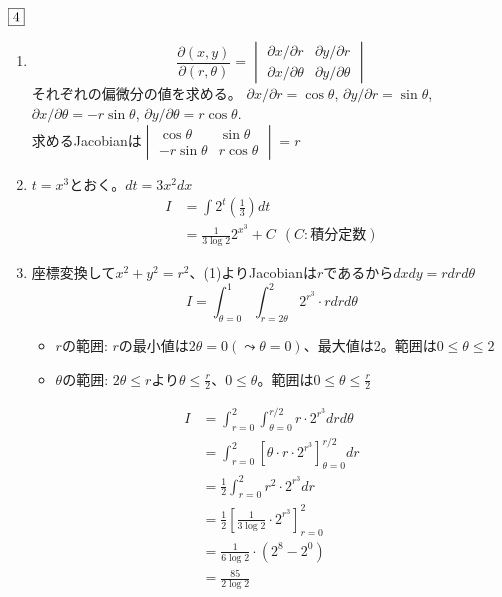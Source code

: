 \documentclass[dvipdfmx]{jsreport}
\newcounter{num}[section]
\begin{document}
\begin{answer} %
	$\fbox{4}$
\begin{enumerate}
	\item 
\begin{equation*}
	\frac{\partial (x, y)}{\partial (r, \theta)}= \begin{vmatrix}{\partial x}/{\partial r}& {\partial y}/{\partial r}\\ {\partial x}/{\partial \theta}& {\partial y}/{\partial \theta}\end{vmatrix}
\end{equation*}
	それぞれの偏微分の値を求める。
	${\partial x}/{\partial r}= \cos{\theta}$, 
	${\partial y}/{\partial r}= \sin{\theta}$, 
	${\partial x}/{\partial \theta}= -r\sin{\theta}$, 
	${\partial y}/{\partial \theta}= r\cos{\theta}$.\\
	求めるJacobianは$\begin{vmatrix}\cos{\theta}& \sin{\theta}\\ -r\sin{\theta}& r\cos{\theta}\end{vmatrix}= r$

	\item $t= x^3$とおく。$dt= 3x^2 dx$
\begin{align*}
	I
	&= \int 2^t \left(\frac{1}{3}\right) dt\\
	&= \frac{1}{3\log{2}} 2^{x^3}+ C\ \ (C:積分定数)
\end{align*}

	\item 座標変換して$x^2+ y^2= r^2$、(1)よりJacobianは$r$であるから$dxdy= r drd\theta$
\begin{equation*}
	I= \int_{\theta= 0}^1 \int_{r= 2\theta}^2 2^{r^3}\cdot rdrd\theta
\end{equation*}

\begin{tcolorbox}
\begin{itemize}
	\item $r$の範囲: $r$の最小値は$2\theta= 0(\leadsto \theta= 0)$、最大値は2。範囲は$0\le \theta\le 2$
	\item $\theta$の範囲: $2\theta\le r$より$\theta\le \frac{r}{2}$、$0\le \theta$。範囲は$0\le \theta\le \frac{r}{2}$
\end{itemize}
\end{tcolorbox}
\begin{align*}
	I
	&= \int_{r= 0}^2\int_{\theta= 0}^{r/2} r\cdot 2^{r^3}drd\theta\\
	&= \int_{r= 0}^2\left[\theta\cdot r\cdot 2^{r^3}\right]_{\theta= 0}^{r/2}dr\\
	&= \frac{1}{2}\int_{r= 0}^2 r^2\cdot 2^{r^3}dr\\
	&= \frac{1}{2}\left[\frac{1}{3\log{2}}\cdot 2^{r^3}\right]_{r= 0}^2\\
	&= \frac{1}{6\log{2}}\cdot (2^8- 2^0)\\
	&= \frac{85}{2\log{2}}
\end{align*}
\end{enumerate}
\end{answer}
\end{document}
